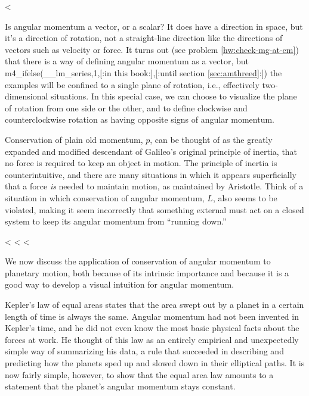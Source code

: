 <%

Is angular momentum a vector, or a scalar? It does have a
direction in space, but it's a direction of rotation, not a
straight-line direction like the directions of vectors such
as velocity or force. It turns out (see problem \ref{hw:check-mg-at-cm}) that there is a way of
defining angular momentum as a vector, but 
m4_ifelse(__lm_series,1,[:in this book:],[:until section \ref{sec:amthreed}:])
the
examples will be confined to a single plane of rotation,
i.e., effectively two-dimensional situations. In this special
case, we can choose to visualize the plane of rotation from
one side or the other, and to define clockwise and
counterclockwise rotation as having opposite signs
of angular momentum.

\startdq

\begin{dq}
Conservation of plain old momentum, $p$, can be thought of
as the greatly expanded and modified descendant of Galileo's
original principle of inertia, that no force is required to
keep an object in motion. The principle of inertia is
counterintuitive, and there are many situations in which it
appears superficially that a force \emph{is} needed to
maintain motion, as maintained by Aristotle. Think of a
situation in which conservation of angular momentum, $L$,
also seems to be violated, making it seem incorrectly that
something external must act on a closed system to keep its
angular momentum from ``running down.''
\end{dq}

<%
<%
<%

We now discuss the application of conservation of angular
momentum to planetary motion, both because of its intrinsic
importance and because it is a good way to develop a visual
intuition for angular momentum.

Kepler's law of equal areas
states that the area swept out by a planet in a certain
length of time is always the same. Angular momentum had not
been invented in Kepler's time, and he did not even know the
most basic physical facts about the forces at work. He
thought of this law as an entirely empirical and unexpectedly
simple way of summarizing his data, a rule that succeeded in
describing and predicting how the planets sped up and slowed
down in their elliptical paths. It is now fairly simple,
however, to show that the equal area law amounts to a
statement that the planet's angular momentum stays constant.

